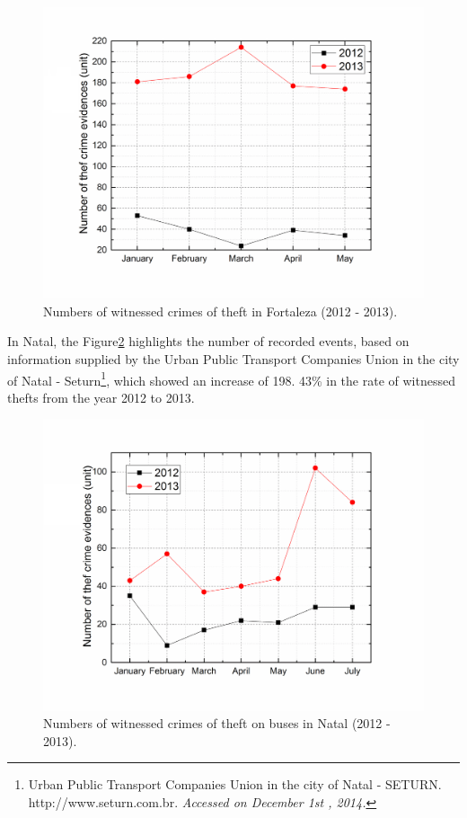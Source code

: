 \begin{figure}[htb!]
	\centering
  	\includegraphics[scale=0.20]{Imagens/intro_fortaleza.png}
  	\caption{Numbers of witnessed crimes of theft in Fortaleza (2012 - 2013).}
  	\label{fig:fortal}
\end{figure}

In Natal, the Figure\ref{fig:natal} highlights the number of recorded events, based on information supplied by the Urban Public Transport Companies Union in the city of Natal - Seturn\footnote[3]{Urban Public Transport Companies Union in the city of Natal - SETURN. http://www.seturn.com.br. \textit{Accessed on December 1st , 2014.}}, which showed an increase of 198. 43\% in the rate of witnessed thefts from the year 2012 to 2013.

\begin{figure}[htb!]
	\centering
  	\includegraphics[scale=0.20]{Imagens/intro_natal.png}
  	\caption{Numbers of witnessed crimes of theft on buses in Natal (2012 - 2013).}
  	\label{fig:natal}
\end{figure}

